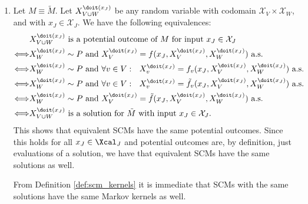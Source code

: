 \begin{enumerate}
\begin{ungradedsolution}
\begin{enumerate}
      \item Let $M \equiv \tilde{M}$.
      Let $X_{V\cup W}^{\doit(x_J)}$ be any random variable with codomain $\mathcal{X}_V \times \mathcal{X}_W$, and with $x_J \in \mathcal{X}_J$.
      We have the following equivalences:
      \begin{align*}
                            & X_{V \cup W}^{\doit(x_J)} \text{ is a potential outcome of } M \text{ for input } x_J \in \mathcal{X}_J                                         \\
        \Longleftrightarrow & X_W^{\doit(x_J)} \sim P \text{ and } X_V^{\doit(x_J)} = f(x_J, X_V^{\doit(x_J)}, X_W^{\doit(x_J)}) \text{ a.s. }                                \\
        \Longleftrightarrow & X_W^{\doit(x_J)} \sim P \text{ and } \forall v \in V: \ \ X_v^{\doit(x_J)} = f_v(x_J, X_V^{\doit(x_J)}, X_W^{\doit(x_J)}) \text{ a.s. }         \\
        \Longleftrightarrow & X_W^{\doit(x_J)} \sim P \text{ and } \forall v \in V: \ \ X_v^{\doit(x_J)} = \tilde{f}_v(x_J, X_V^{\doit(x_J)}, X_W^{\doit(x_J)}) \text{ a.s. } \\
        \Longleftrightarrow & X_W^{\doit(x_J)} \sim P \text{ and } X_V^{\doit(x_J)} = \tilde{f}(x_J, X_V^{\doit(x_J)}, X_W^{\doit(x_J)}) \text{ a.s. }                        \\
        \Longleftrightarrow & X_{V \cup W}^{\doit(x_J)} \text{ is a solution for } \tilde{M} \text{ with input } x_J \in \mathcal{X}_J.
      \end{align*}
      This shows that equivalent SCMs have the same potential outcomes. Since this holds for all $x_J \in \Xcal_J$ and potential outcomes are, by definition, just evaluations of a solution, we have that equivalent SCMs have the same solutions as well.

      From Definition \ref*{def:scm_kernels} it is immediate that SCMs with the same solutions have the same Markov kernels as well.
    \end{enumerate}
  \end{ungradedsolution}


\end{enumerate}
